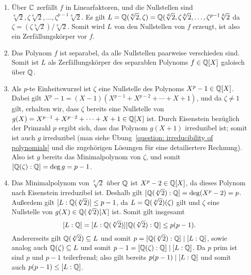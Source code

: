 \begin{solution}
  \begin{enumerate}
    \item
      Über $\mathbb{C}$ zerfällt $f$ in Linearfaktoren, und die Nullstellen sind $\sqrt[6]{2}, \zeta \sqrt[6]{2}, \dotsc, \zeta^{p-1} \sqrt[6]{2}$.
      Es gilt $L = \mathbb{Q}(\sqrt[6]{2}, \zeta) = \mathbb{Q}(\sqrt[6]{2}, \zeta \sqrt[6]{2}, \dotsc, \zeta^{p-1} \sqrt[6]{2}$ da $\zeta = (\zeta \sqrt[6]{2})/\sqrt[6]{2}$.
      Somit wird $L$ von den Nullstellen von $f$ erzeugt, ist also ein Zerfällungskörper vor $f$.
      
    \item
      Das Polynom $f$ ist separabel, da alle Nullstellen paarweise verschieden sind.
      Somit ist $L$ als Zerfällungskörper des separablen Polynoms $f \in \mathbb{Q}[X]$ galoisch über $\mathbb{Q}$.
      
    \item
      Als $p$-te Einheitswurzel ist $\zeta$ eine Nullstelle des Polynoms $X^p - 1 \in \mathbb{Q}[X]$.
      Dabei gilt $X^p - 1 = (X-1)(X^{p-1} + X^{p-2} + \dotsb + X + 1)$, und da $\zeta \neq 1$ gilt, erhalten wir, dass $\zeta$ bereits eine Nullstelle von $g(X)  = X^{p-1} + X^{p-2} + \dotsb + X + 1 \in \mathbb{Q}[X]$ ist.
      Durch Eisenstein bezüglich der Primzahl $p$ ergibt sich, dass das Polynom $g(X+1)$ irreduzibel ist; somit ist auch $g$ irreduzibel (man siehe Übung~\ref{question: irreducibility of polynomials} und die zugehörigen Lösungen für eine detailiertere Rechnung).
      Also ist $g$ bereits das Minimalpolynom von $\zeta$, und somit $[\mathbb{Q}(\zeta) : \mathbb{Q}] = \deg g = p-1$.
      
    \item
      Das Minimalpolynom von $\sqrt[p]{2}$ über $\mathbb{Q}$ ist $X^p - 2 \in \mathbb{Q}[X]$, da dieses Polynom nach Eisenstein irreduzibel ist.
      Deshalb gilt $[\mathbb{Q}(\sqrt[p]{2}) : \mathbb{Q}] = \deg (X^p - 2) = p$.
      Außerdem gilt $[L : \mathbb{Q}(\sqrt[p]{2})] \leq p-1$, da $L = \mathbb{Q}(\sqrt[p]{2})(\zeta)$ gilt und $\zeta$ eine Nullstelle von $g(X) \in \mathbb{Q}(\sqrt[p]{2})[X]$ ist.
      Somit gilt insgesamt
      \[
              [L : \mathbb{Q}]
        =     [L : \mathbb{Q}(\sqrt[p]{2})] [\mathbb{Q}(\sqrt[p]{2}) : \mathbb{Q}]
        \leq  p(p-1).
      \]
      Andererseits gilt $\mathbb{Q}(\sqrt[p]{2}) \subseteq L$ und somit $p = [\mathbb{Q}(\sqrt[p]{2}) : \mathbb{Q}] \mid [L : \mathbb{Q}]$, sowie analog auch $\mathbb{Q}(\zeta) \subseteq L$ und somit $p-1 = [\mathbb{Q}(\zeta) : \mathbb{Q}] \mid [L : \mathbb{Q}]$.
      Da $p$ prim ist sind $p$ und $p-1$ teilerfremd; also gilt bereits $p(p-1) \mid [L : \mathbb{Q}]$ und somit auch $p(p-1) \leq [L : \mathbb{Q}]$.
      

\end{enumerate}
\end{solution}
